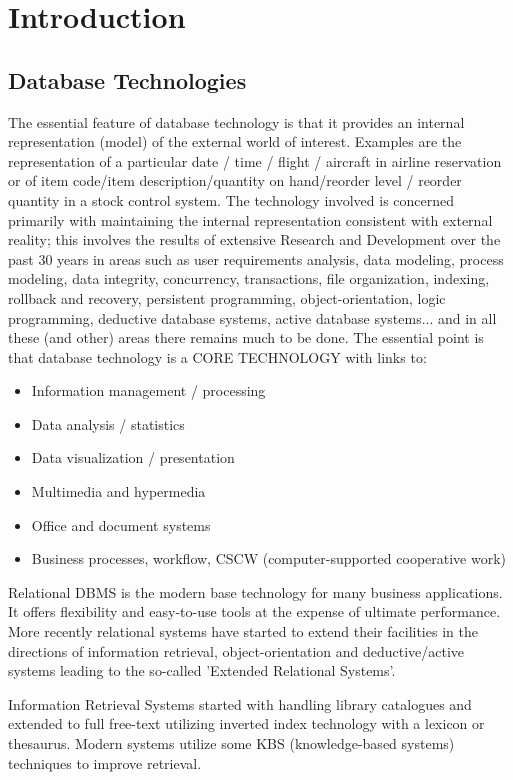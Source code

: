 \chapter{Introduction}

\section{Database Technologies}
The essential feature of database technology is that it provides an internal representation (model) of the external world of interest. Examples are the representation of a particular date / time / flight / aircraft in airline reservation or of item code/item description/quantity on hand/reorder level / reorder quantity in a stock control system. The technology involved is concerned primarily with maintaining the internal representation consistent with external reality; this involves the results of extensive Research and Development over the past 30 years in areas such as user requirements analysis, data modeling, process modeling, data integrity, concurrency, transactions, file organization, indexing, rollback and recovery, persistent programming, object-orientation, logic programming, deductive database systems, active database systems... and in all these (and other) areas there remains much to be done. The essential point is that database technology is a CORE TECHNOLOGY with links to:
\begin{itemize}
\item{Information management / processing}
\item{Data analysis / statistics}
\item{Data visualization / presentation}
\item{Multimedia and hypermedia}
\item{Office and document systems}
\item{Business processes, workflow, CSCW (computer-supported cooperative work)}
\end{itemize}
Relational DBMS is the modern base technology for many business applications. It offers flexibility and easy-to-use tools at the expense of ultimate performance. More recently relational systems have started to extend their facilities in the directions of information retrieval, object-orientation and deductive/active systems leading to the so-called 'Extended
Relational Systems'.

Information Retrieval Systems started with handling library catalogues and extended to full free-text utilizing inverted index technology with a lexicon or thesaurus. Modern systems utilize some KBS (knowledge-based systems) techniques to improve retrieval.

